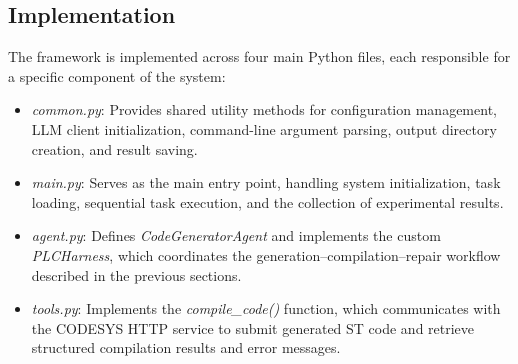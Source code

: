 \documentclass{article}
\begin{document}
\subsection{Implementation}

The framework is implemented across four main Python files, each responsible for a specific component of the system:

\begin{itemize}
\item \textit{common.py}: Provides shared utility methods for configuration management, LLM client initialization, command-line argument parsing, output directory creation, and result saving.
\item \textit{main.py}: Serves as the main entry point, handling system initialization, task loading, sequential task execution, and the collection of experimental results.
\item \textit{agent.py}: Defines \textit{CodeGeneratorAgent} and implements the custom \textit{PLCHarness}, which coordinates the generation–compilation–repair workflow described in the previous sections.
\item \textit{tools.py}: Implements the \textit{compile\_code()} function, which communicates with the CODESYS HTTP service to submit generated ST code and retrieve structured compilation results and error messages.
\end{itemize}
\end{document}
